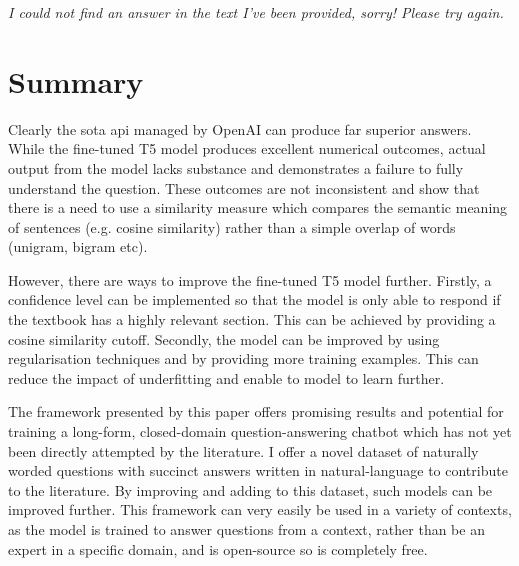 \documentclass{article}
\newenvironment{itquote}
  {\begin{displayquote}\itshape}
  {\end{displayquote}\ignorespacesafterend}
\begin{document}
\begin{itquote}
    I could not find an answer in the text I've been provided, sorry! Please try again.
\end{itquote}


\section{Summary}
Clearly the \acrshort{sota} \acrshort{api} managed by OpenAI can produce far superior answers. While the fine-tuned T5 model produces excellent numerical outcomes, actual output from the model lacks substance and demonstrates a failure to fully understand the question. These outcomes are not inconsistent and show that there is a need to use a similarity measure which compares the semantic meaning of sentences (e.g. cosine similarity) rather than a simple overlap of words (unigram, bigram etc).

However, there are ways to improve the fine-tuned T5 model further. Firstly, a confidence level can be implemented so that the model is only able to respond if the textbook has a highly relevant section. This can be achieved by providing a cosine similarity cutoff. Secondly, the model can be improved by using regularisation techniques and by providing more training examples. This can reduce the impact of underfitting and enable to model to learn further.

The framework presented by this paper offers promising results and potential for training a long-form, closed-domain question-answering chatbot which has not yet been directly attempted by the literature. I offer a novel dataset of naturally worded questions with succinct answers written in natural-language to contribute to the literature. By improving and adding to this dataset, such models can be improved further. This framework can very easily be used in a variety of contexts, as the model is trained to answer questions from a context, rather than be an expert in a specific domain, and is open-source so is completely free. 
\end{document}
